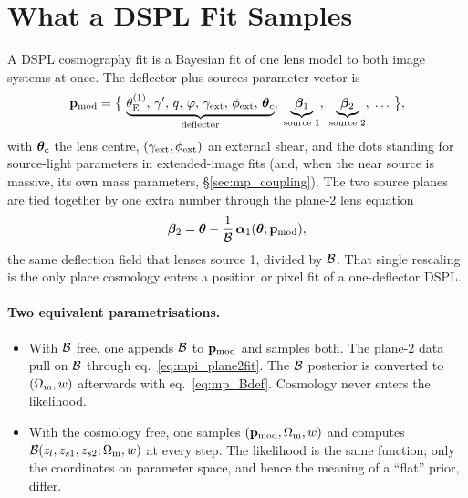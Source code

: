 \section{What a DSPL Fit Samples}
\label{sec:mpi_sampling}

A DSPL cosmography fit is a Bayesian fit of one lens model to both image
systems at once.  The deflector-plus-sources parameter vector is
\begin{equation}
  \mathbf{p}_{\rm mod} = \big\{\,\underbrace{\theta_{\mathrm{E}}^{(1)},\,\gamma',\,q,\,\varphi,\,
  \gamma_{\rm ext},\,\phi_{\rm ext},\,\boldsymbol{\theta}_c}_{\text{deflector}},\;
  \underbrace{\boldsymbol{\beta}_{1}}_{\text{source 1}},\;
  \underbrace{\boldsymbol{\beta}_{2}}_{\text{source 2}},\;
  \dots\,\big\},
  \label{eq:mpi_pmod}
\end{equation}
with $\boldsymbol{\theta}_c$ the lens centre, $(\gamma_{\rm ext},\phi_{\rm ext})$
an external shear, and the dots standing for source-light parameters in
extended-image fits (and, when the near source is massive, its own mass
parameters, \S\ref{sec:mp_coupling}).  The two source planes are tied
together by one extra number through the plane-2 lens equation
\begin{equation}
  \boldsymbol{\beta}_2 = \boldsymbol{\theta} - \frac{1}{\mathcal{B}}\,\boldsymbol{\alpha}_1(\boldsymbol{\theta};\mathbf{p}_{\rm mod}),
  \label{eq:mpi_plane2fit}
\end{equation}
the same deflection field that lenses source 1, divided by $\mathcal{B}$.
That single rescaling is the only place cosmology enters a position or
pixel fit of a one-deflector DSPL.

\paragraph{Two equivalent parametrisations.}
\begin{itemize}[nosep]
  \item[(a)] With $\mathcal{B}$ free, one appends $\mathcal{B}$ to
        $\mathbf{p}_{\rm mod}$ and samples both.  The plane-2 data pull on
        $\mathcal{B}$ through eq.~\eqref{eq:mpi_plane2fit}.  The $\mathcal{B}$
        posterior is converted to $(\Omega_{\mathrm{m}},w)$ afterwards with
        eq.~\eqref{eq:mp_Bdef}.  Cosmology never enters the likelihood.
  \item[(b)] With the cosmology free, one samples
        $(\mathbf{p}_{\rm mod},\Omega_{\mathrm{m}},w)$ and computes
        $\mathcal{B}(z_l,z_{s1},z_{s2};\Omega_{\mathrm{m}},w)$ at every step.  The
        likelihood is the same function; only the coordinates on
        parameter space, and hence the meaning of a ``flat'' prior,
        differ.
\end{itemize}

